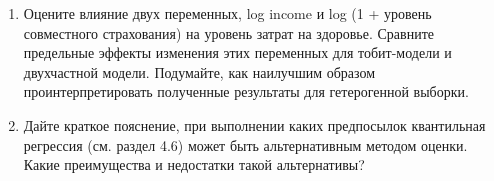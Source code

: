 \begin{enumerate}
\begin{enumerate}
\item 	Оцените влияние двух переменных, log income и log (1 + уровень совместного страхования) на уровень затрат на здоровье. Сравните предельные эффекты изменения этих переменных для тобит-модели и двухчастной модели. Подумайте, как наилучшим образом проинтерпретировать полученные результаты для гетерогенной выборки.
\item 	Дайте краткое пояснение, при выполнении каких предпосылок квантильная регрессия (см. раздел 4.6) может быть альтернативным методом оценки. Какие преимущества и недостатки такой альтернативы?
\end{enumerate}
\end{enumerate}

